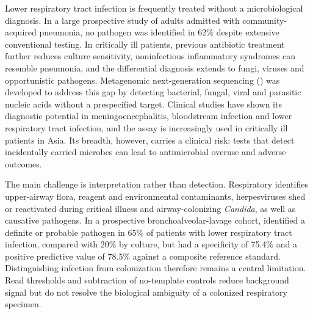 
Lower respiratory tract infection is frequently treated without a microbiological diagnosis. In a large prospective study of adults admitted with community-acquired pneumonia, no pathogen was identified in 62\% despite extensive conventional testing\cite{jain2015community}. In critically ill patients, previous antibiotic treatment further reduces culture sensitivity\cite{miao2018microbiological}, noninfectious inflammatory syndromes can resemble pneumonia\cite{langelier2018integrating}, and the differential diagnosis extends to fungi, viruses and opportunistic pathogens. Metagenomic next-generation sequencing (\mngs) was developed to address this gap by detecting bacterial, fungal, viral and parasitic nucleic acids without a prespecified target\cite{chiu2019clinical,simner2018understanding}. Clinical studies have shown its diagnostic potential in meningoencephalitis\cite{wilson2019clinical}, bloodstream infection\cite{blauwkamp2019analytical,hogan2021clinical} and lower respiratory tract infection\cite{charalampous2019nanopore,langelier2018integrating,chen2020clinical,diao2022metagenomics}, and the assay is increasingly used in critically ill patients in Asia\cite{miao2018microbiological,han2019mngs}. Its breadth, however, carries a clinical risk: tests that detect incidentally carried microbes can lead to antimicrobial overuse and adverse outcomes\cite{mick2023integrated}.

The main challenge is interpretation rather than detection. Respiratory \mngs identifies upper-airway flora\cite{charlson2011topographical,dickson2016microbiome}, reagent and environmental contaminants\cite{salter2014reagent}, herpesviruses shed or reactivated during critical illness\cite{luyt2007herpes,limaye2008cytomegalovirus} and airway-colonizing \textit{Candida}\cite{meersseman2009significance}, as well as causative pathogens. In a prospective bronchoalveolar-lavage cohort, \mngs identified a definite or probable pathogen in 65\% of patients with lower respiratory tract infection, compared with 20\% by culture, but had a specificity of 75.4\% and a positive predictive value of 78.5\% against a composite reference standard\cite{chen2020clinical}. Distinguishing infection from colonization therefore remains a central limitation\cite{simner2018understanding,diao2022metagenomics}. Read thresholds and subtraction of no-template controls reduce background signal but do not resolve the biological ambiguity of a colonized respiratory specimen\cite{miller2019laboratory,schlaberg2017validation}.


